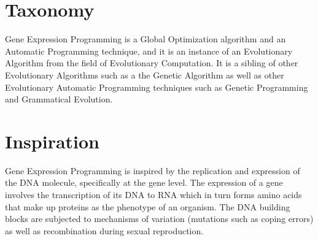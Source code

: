 \documentclass[a4paper, 11pt]{article}
\begin{document}
\section{Taxonomy}
\label{sec:taxonomy}
Gene Expression Programming is a Global Optimization algorithm and an Automatic Programming technique, and it is an instance of an Evolutionary Algorithm from the field of Evolutionary Computation.
It is a sibling of other Evolutionary Algorithms such as a the Genetic Algorithm as well as other Evolutionary Automatic Programming techniques such as Genetic Programming and Grammatical Evolution.

\section{Inspiration}
\label{sec:inspiration}
Gene Expression Programming is inspired by the replication and expression of the DNA molecule, specifically at the gene level. 
The expression of a gene involves the transcription of its DNA to RNA which in turn forms amino acids that make up proteins as the phenotype of an organism. 
The DNA building blocks are subjected to mechanisms of variation (mutations such as coping errors) as well as recombination during sexual reproduction.
\end{document}
